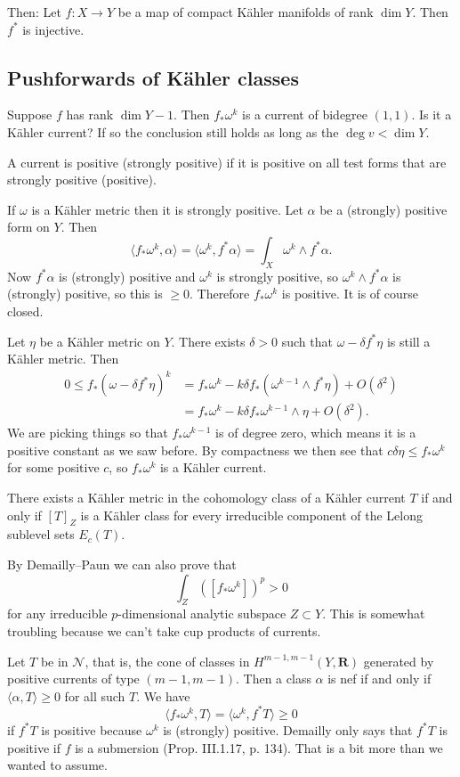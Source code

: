 \documentclass[11pt]{amsart}
\theoremstyle{definition}
\def\RR{\mathbf{R}}
\def\<{\langle}
\def\>{\rangle}
\begin{document}
Then: Let $f : X \to Y$ be a map of compact K\"ahler manifolds of rank $\dim Y$.
Then $f^*$ is injective.



\subsection*{Pushforwards of K\"ahler classes}

Suppose $f$ has rank $\dim Y - 1$.
Then $f_* \omega^k$ is a current of bidegree $(1,1)$.
Is it a K\"ahler current?
If so the conclusion still holds as long as the $\operatorname{deg} v < \dim Y$.

A current is positive (strongly positive) if it is positive on all test forms that are strongly positive (positive).

If $\omega$ is a K\"ahler metric then it is strongly positive.
Let $\alpha$ be a (strongly) positive form on $Y$.
Then
\[
\< f_*\omega^k, \alpha \>
= \< \omega^k, f^* \alpha \>
= \int_X \omega^k \wedge f^*\alpha.
\]
Now $f^*\alpha$ is (strongly) positive and $\omega^k$ is strongly positive, so $\omega^k \wedge f^*\alpha$ is (strongly) positive, so this is $\geq 0$.
Therefore $f_*\omega^k$ is positive.
It is of course closed.

Let $\eta$ be a K\"ahler metric on $Y$.
There exists $\delta > 0$ such that $\omega - \delta f^*\eta$ is still a K\"ahler metric.
Then
\begin{align*}
0 \leq f_*(\omega - \delta f^*\eta)^k
&= f_* \omega^k 
- k \delta f_*(\omega^{k-1} \wedge f^*\eta)
+ O(\delta^2)
\\
&= f_* \omega^k 
- k \delta f_*\omega^{k-1} \wedge \eta
+ O(\delta^2).
\end{align*}
We are picking things so that $f_*\omega^{k-1}$ is of degree zero, which means it is a positive constant as we saw before.
By compactness we then see that $c \delta \eta \leq f_*\omega^k$ for some positive $c$, so $f_*\omega^k$ is a K\"ahler current.

There exists a K\"ahler metric in the cohomology class of a K\"ahler current $T$ if and only if $[T]_{Z}$ is a K\"ahler class for every irreducible component of the Lelong sublevel sets $E_c(T)$.

By Demailly--Paun we can also prove that
\[
\int_Z ([f_*\omega^k])^p > 0
\]
for any irreducible $p$-dimensional analytic subspace $Z \subset Y$.
This is somewhat troubling because we can't take cup products of currents.


Let $T$ be in $\mathcal N$, that is, the cone of classes in $H^{m-1,m-1}(Y,\RR)$ generated by positive currents of type $(m-1,m-1)$.
Then a class $\alpha$ is nef if and only if $\<\alpha, T\> \geq 0$ for all such $T$.
We have
\[
\< f_* \omega^k, T \>
= \< \omega^k, f^*T \>
\geq 0
\]
if $f^*T$ is positive because $\omega^k$ is (strongly) positive.
Demailly only says that $f^*T$ is positive if $f$ is a submersion (Prop. III.1.17, p. 134).
That is a bit more than we wanted to assume.
\end{document}
